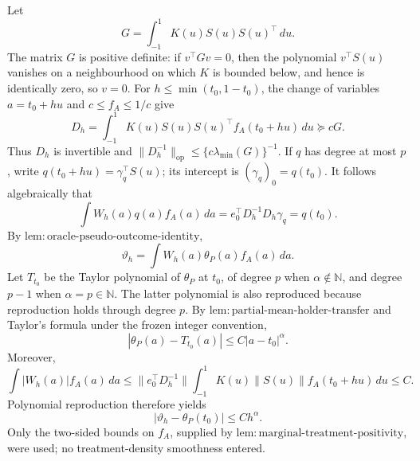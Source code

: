 Let
\[
G=\int_{-1}^1K(u)S(u)S(u)^\top\,du.
\]
The matrix \(G\) is positive definite: if \(v^\top Gv=0\), then the polynomial \(v^\top S(u)\) vanishes on a neighbourhood on which \(K\) is bounded below, and hence is identically zero, so \(v=0\). For \(h\le\min(t_0,1-t_0)\), the change of variables \(a=t_0+hu\) and \(c\le f_A\le1/c\) give
\[
D_h=
\int_{-1}^1K(u)S(u)S(u)^\top f_A(t_0+hu)\,du
\succeq cG.
\]
Thus \(D_h\) is invertible and \(\|D_h^{-1}\|_{\mathrm{op}}\le\{c\lambda_{\min}(G)\}^{-1}\). If \(q\) has degree at most \(p\), write \(q(t_0+hu)=\gamma_q^\top S(u)\); its intercept is \((\gamma_q)_0=q(t_0)\). It follows algebraically that
\[
\int W_h(a)q(a)f_A(a)\,da
=
e_0^\top D_h^{-1}D_h\gamma_q
=q(t_0).
\]
By \(\mathrm{lem:oracle\text{-}pseudo\text{-}outcome\text{-}identity}\),
\[
\vartheta_h=
\int W_h(a)\theta_P(a)f_A(a)\,da.
\]
Let \(T_{t_0}\) be the Taylor polynomial of \(\theta_P\) at \(t_0\), of degree \(p\) when \(\alpha\notin\mathbb N\), and degree \(p-1\) when \(\alpha=p\in\mathbb N\). The latter polynomial is also reproduced because reproduction holds through degree \(p\). By \(\mathrm{lem:partial\text{-}mean\text{-}holder\text{-}transfer}\) and Taylor's formula under the frozen integer convention,
\[
|\theta_P(a)-T_{t_0}(a)|
\le C|a-t_0|^\alpha.
\]
Moreover,
\[
\int|W_h(a)|f_A(a)\,da
\le
\|e_0^\top D_h^{-1}\|
\int_{-1}^1K(u)\|S(u)\|f_A(t_0+hu)\,du
\le C.
\]
Polynomial reproduction therefore yields
\[
|\vartheta_h-\theta_P(t_0)|
\le Ch^\alpha.
\]
Only the two-sided bounds on \(f_A\), supplied by \(\mathrm{lem:marginal\text{-}treatment\text{-}positivity}\), were used; no treatment-density smoothness entered.